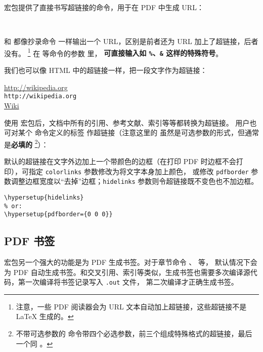  宏包提供了直接书写超链接的命令，用于在 PDF 中生成 URL：
\begin{command}
 \\
\end{command}

 和  都像抄录命令  一样输出一个 URL，区别是前者还为 URL 加上了超链接，后者没有。%
\footnote{注意，一些 PDF 阅读器会为 URL 文本自动加上超链接，这些超链接不是 \LaTeX{} 生成的。}%
在  等命令的参数  里，
\textbf{可直接输入如 \texttt\%、\texttt\& 这样的特殊符号}。

我们也可以像 HTML 中的超链接一样，把一段文字作为超链接：
\begin{command}
\end{command}

\begin{example}
\url{http://wikipedia.org} \\
\nolinkurl{http://wikipedia.org} \\
\href{http://wikipedia.org}{Wiki}
\end{example}

使用  宏包后，文档中所有的引用、参考文献、索引等等都转换为超链接。
用户也可对某个  命令定义的标签  作超链接（注意这里的  虽然是可选参数的形式，但通常是\textbf{必填的}%
\footnote{不带可选参数的  命令带四个必选参数，前三个组成特殊格式的超链接，最后一个同 。}）：
\begin{command}
\end{command}

默认的超链接在文字外边加上一个带颜色的边框（在打印 PDF 时边框不会打印），可指定 \texttt{color\-links} 参数修改为将文字本身加上颜色，
或修改 \texttt{pdf\-border} 参数调整边框宽度以“去掉”边框；\texttt{hide\-links} 参数则令超链接既不变色也不加边框。
\begin{verbatim}
\hypersetup{hidelinks}
% or:
\hypersetup{pdfborder={0 0 0}}
\end{verbatim}

\subsection{PDF 书签}\label{subsec:pdf-bookmark}

 宏包另一个强大的功能是为 PDF 生成书签。对于章节命令 、 等，
默认情况下会为 PDF 自动生成书签。和交叉引用、索引等类似，生成书签也需要多次编译源代码，第一次编译将书签记录写入 \texttt{.out} 文件，
第二次编译才正确生成书签。

